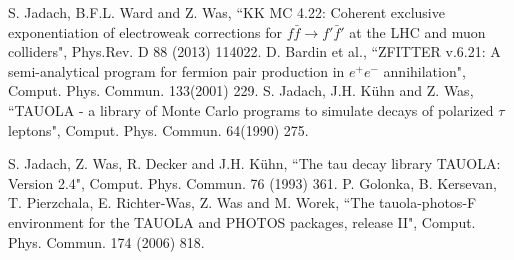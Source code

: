 \documentclass
[
]
{thesis}
\begin{document}
\begin{thebibliography}{widestlabel}
	 S. Jadach, B.F.L. Ward and Z. Was, ``KK MC 4.22: Coherent exclusive exponentiation of electroweak corrections for $f\bar{f}\to f'\bar{f}'$ at the LHC and muon colliders", Phys.Rev. D 88 (2013) 114022.
	 D. Bardin et al., ``ZFITTER v.6.21: A semi-analytical program for fermion pair production in $e^+e^-$ annihilation", Comput. Phys. Commun. 133(2001) 229.
	 S. Jadach, J.H. K{\"u}hn and Z. Was, ``TAUOLA - a library of Monte Carlo programs to simulate decays of polarized $\tau$ leptons", Comput. Phys. Commun. 64(1990) 275.
	
	 S. Jadach, Z. Was, R. Decker and J.H. K{\"u}hn, ``The tau decay library TAUOLA: Version 2.4", Comput. Phys. Commun. 76 (1993) 361.
	 P. Golonka, B. Kersevan, T. Pierzchala, E. Richter-Was, Z. Was and M. Worek, ``The tauola-photos-F environment for the TAUOLA and PHOTOS packages, release II", Comput. Phys. Commun. 174 (2006) 818.
	

\end{thebibliography}
\end{document}

